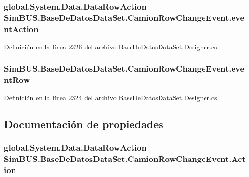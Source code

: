 \subsubsection[{event\-Action}]{\setlength{\rightskip}{0pt plus 5cm}global.\-System.\-Data.\-Data\-Row\-Action Sim\-B\-U\-S.\-Base\-De\-Datos\-Data\-Set.\-Camion\-Row\-Change\-Event.\-event\-Action\hspace{0.3cm}{\ttfamily [private]}}\label{class_sim_b_u_s_1_1_base_de_datos_data_set_1_1_camion_row_change_event_a6446293def184b89cd72a1cbdbce1e01}


Definición en la línea 2326 del archivo Base\-De\-Datos\-Data\-Set.\-Designer.\-cs.

\subsubsection[{event\-Row}]{ Sim\-B\-U\-S.\-Base\-De\-Datos\-Data\-Set.\-Camion\-Row\-Change\-Event.\-event\-Row\hspace{0.3cm}{\ttfamily [private]}}\label{class_sim_b_u_s_1_1_base_de_datos_data_set_1_1_camion_row_change_event_aa023ca04cac01de82a5d05110bd6146b}


Definición en la línea 2324 del archivo Base\-De\-Datos\-Data\-Set.\-Designer.\-cs.



\subsection{Documentación de propiedades}
\subsubsection[{Action}]{\setlength{\rightskip}{0pt plus 5cm}global.\-System.\-Data.\-Data\-Row\-Action Sim\-B\-U\-S.\-Base\-De\-Datos\-Data\-Set.\-Camion\-Row\-Change\-Event.\-Action\hspace{0.3cm}{\ttfamily [get]}}\label{class_sim_b_u_s_1_1_base_de_datos_data_set_1_1_camion_row_change_event_afd002609133926700d9bf7e5cb164218}


